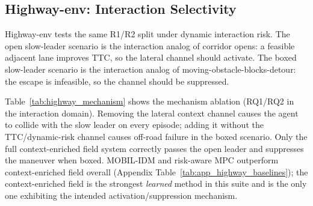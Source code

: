 \subsection{Highway-env: Interaction Selectivity}
\label{sec:exp_highway}

Highway-env tests the same R1/R2 split under dynamic interaction risk.
The open slow-leader scenario is the interaction analog of corridor
opens: a feasible adjacent lane improves TTC, so the lateral channel
should activate.
The boxed slow-leader scenario is the interaction analog of
moving-obstacle-blocks-detour: the escape is infeasible, so the channel
should be suppressed.

Table~\ref{tab:highway_mechanism} shows the mechanism ablation
(RQ1/RQ2 in the interaction domain).
Removing the lateral context channel causes the agent to collide with
the slow leader on every episode; adding it without the TTC/dynamic-risk
channel causes off-road failure in the boxed scenario.
Only the full context-enriched field system correctly passes the open leader and
suppresses the maneuver when boxed.
MOBIL-IDM and risk-aware MPC outperform context-enriched field overall (Appendix
Table~\ref{tab:app_highway_baselines}); the context-enriched field is the strongest
\emph{learned} method in this suite and is the only one exhibiting
the intended activation/suppression mechanism.

\begin{table}[t]
\centering
\caption{\textbf{Highway mechanism ablation} ($200$ paired seeds per
scenario).
The lateral channel enables passing; the TTC/dynamic-risk channel
suppresses the same maneuver when boxed.
Full scenario-level results in Appendix
Table~\ref{tab:app_highway_baselines}.}
\label{tab:highway_mechanism}
\scriptsize
\setlength{\tabcolsep}{3pt}
\renewcommand{\arraystretch}{1.08}
\end{table}

